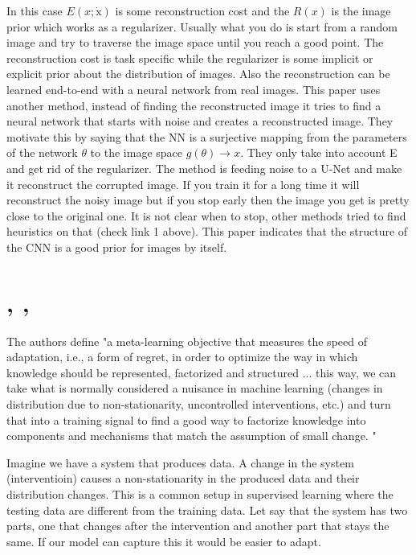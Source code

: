 \documentclass{article}
\newcommand{\citeall}[1]{\citeauthor{#1}, \citetitle{#1}, \citeyear{#1}}
\begin{document}
In this case $E(x ; \dot{\mathrm{x}})$ is some reconstruction cost and the $R(x)$ is the image prior which works as a regularizer. Usually what you do is start from a random image and try to traverse the image space until you reach a good point. The reconstruction cost is task specific while the regularizer is some implicit or explicit prior about the distribution of images. Also the reconstruction can be learned end-to-end with a neural network from real images. This paper uses another method, instead of finding the reconstructed image it tries to find a neural network that starts with noise and creates a reconstructed image. They motivate this by saying that the NN is a surjective mapping from the parameters of the network $\theta$ to the image space $g(\theta) \rightarrow x$. They only take into account E and get rid of the regularizer. The method is feeding noise to a U-Net and make it reconstruct the corrupted image. If you train it for a long time it will reconstruct the noisy image but if you stop early then the image you get is pretty close to the original one. It is not clear when to stop, other methods tried to find heuristics on that (check link 1 above). This paper indicates that the structure of the CNN is a good prior for images by itself.

\section{\citeall{Bengio2019AMechanisms}}

The authors define "a meta-learning objective that measures the speed of adaptation, i.e., a form of regret, in order to optimize the way in which knowledge should be represented, factorized and structured ... this way, we can take what is normally considered a nuisance in machine learning (changes in distribution due to non-stationarity, uncontrolled interventions, etc.) and turn that into a training signal to find a good way to factorize knowledge into components and mechanisms that match the assumption of small change. "

Imagine we have a system that produces data. A change in the system (interventioin) causes a non-stationarity in the produced data and their distribution changes. This is a common setup in supervised learning where the testing data are different from the training data. Let say that the system has two parts, one that changes after the intervention and another part that stays the same. If our model can capture this it would be easier to adapt.
\end{document}
